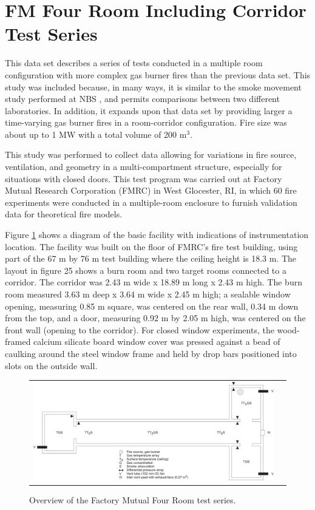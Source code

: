 \section{FM Four Room Including Corridor Test Series}

This data set describes a series of tests conducted in a multiple room configuration with more complex gas burner fires than the previous data set.  This study \cite{Heskestad:1986} was included because, in many ways, it is similar to the smoke movement study performed at NBS \cite{Peacock:1988}, and permits comparisons between two different laboratories. In addition, it expands upon that data set by providing larger a time-varying gas burner fires in a room-corridor configuration. Fire size was about up to 1 MW with a total volume of 200 m$^3$.

This study was performed to collect data allowing for variations in fire source, ventilation, and geometry in a multi-compartment structure, especially for situations with closed doors. This test program was carried out at Factory Mutual Research Corporation (FMRC) in West Glocester, RI, in which 60 fire experiments were conducted in a multiple-room enclosure to furnish validation data for theoretical fire models.

Figure \ref{fig:FMSummary} shows a diagram of the basic facility with indications of instrumentation location. The facility was built on the floor of FMRC's fire test building, using part of the 67 m by 76 m test building where the ceiling height is 18.3 m. The layout in figure 25 shows a burn room and two target rooms connected to a corridor. The corridor was 2.43 m wide x 18.89 m long x 2.43 m high. The burn room measured 3.63 m deep x 3.64 m wide x 2.45 m high; a sealable window opening, measuring 0.85 m square, was centered on the rear wall, 0.34 m down from the top, and a door, measuring 0.92 m by 2.05 m high, was centered on the front wall (opening to the corridor). For closed window experiments, the wood-framed calcium silicate board window cover was pressed against a bead of caulking around the steel window frame and held by drop bars positioned into slots on the outside wall.

\begin{figure}[h]
\begin{center}
\begin{tabular}{cc}
\includegraphics[width=6.0in]{FIGURES/FM_NBS/FMSummary}\\
\end{tabular}
\end{center}
\caption{Overview of the {F}actory {M}utual Four Room test series.}
 \label{fig:FMSummary}
\end{figure}

